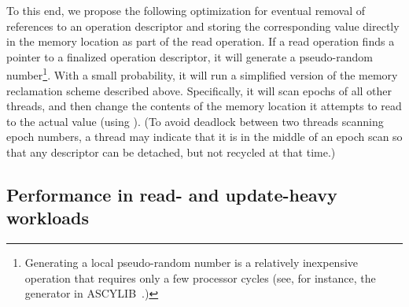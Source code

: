 To this end, we propose the following optimization for eventual removal of references to an operation descriptor 
and storing the corresponding value directly in the memory location as part of the read operation.
If a read operation finds a pointer to a finalized operation descriptor, it will generate a pseudo-random number\footnote{Generating 
a local pseudo-random number is a relatively inexpensive operation that requires only a few processor cycles (see, for instance, the generator in ASCYLIB~\cite{ascylibcode}.)}.
With a small probability, it will run a simplified version of the memory reclamation scheme described above.
Specifically, it will scan epochs of all other threads, and then change the contents of the memory location it attempts to read
to the actual value (using \cas{}).
(To avoid deadlock between two threads scanning epoch numbers, a thread may indicate that it is in the middle of an epoch scan
so that any descriptor can be detached, but not recycled at that time.)

\subsection{Performance in read- and update-heavy workloads}\label{sec:extra-evaluation}

